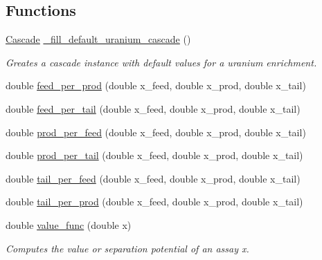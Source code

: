 \subsection*{Functions}
\begin{DoxyCompactItemize}
\item 
\mbox{\label{namespacepyne_1_1enrichment_af7c9529aaf7c9ec69c68ef0ec4d917fa}} 
\hyperlink{classpyne_1_1enrichment_1_1_cascade}{Cascade} \hyperlink{namespacepyne_1_1enrichment_af7c9529aaf7c9ec69c68ef0ec4d917fa}{\+\_\+fill\+\_\+default\+\_\+uranium\+\_\+cascade} ()
\begin{DoxyCompactList}\small\item\em Greates a cascade instance with default values for a uranium enrichment. \end{DoxyCompactList}\item 
double \hyperlink{namespacepyne_1_1enrichment_a3c67817d22ac579e8dec6c2c6b67348b}{feed\+\_\+per\+\_\+prod} (double x\+\_\+feed, double x\+\_\+prod, double x\+\_\+tail)
\item 
double \hyperlink{namespacepyne_1_1enrichment_ac3c2ba735a52b7dab783a4901058430e}{feed\+\_\+per\+\_\+tail} (double x\+\_\+feed, double x\+\_\+prod, double x\+\_\+tail)
\item 
double \hyperlink{namespacepyne_1_1enrichment_ae198e1b1919eeebccd2f1b1bf60ef3db}{prod\+\_\+per\+\_\+feed} (double x\+\_\+feed, double x\+\_\+prod, double x\+\_\+tail)
\item 
double \hyperlink{namespacepyne_1_1enrichment_a1d7622f2e9706ef8cdfcc793e2818ad4}{prod\+\_\+per\+\_\+tail} (double x\+\_\+feed, double x\+\_\+prod, double x\+\_\+tail)
\item 
double \hyperlink{namespacepyne_1_1enrichment_a86ccc9aa699994c1bfc44ba2b6104acb}{tail\+\_\+per\+\_\+feed} (double x\+\_\+feed, double x\+\_\+prod, double x\+\_\+tail)
\item 
double \hyperlink{namespacepyne_1_1enrichment_a34832108a2dfff7dafd33e85ca4eeded}{tail\+\_\+per\+\_\+prod} (double x\+\_\+feed, double x\+\_\+prod, double x\+\_\+tail)
\item 
\mbox{\label{namespacepyne_1_1enrichment_a865bcbc0bcd12350c22337a6263c39c6}} 
double \hyperlink{namespacepyne_1_1enrichment_a865bcbc0bcd12350c22337a6263c39c6}{value\+\_\+func} (double x)
\begin{DoxyCompactList}\small\item\em Computes the value or separation potential of an assay {\itshape x}. \end{DoxyCompactList}\item 

\end{DoxyCompactItemize}
